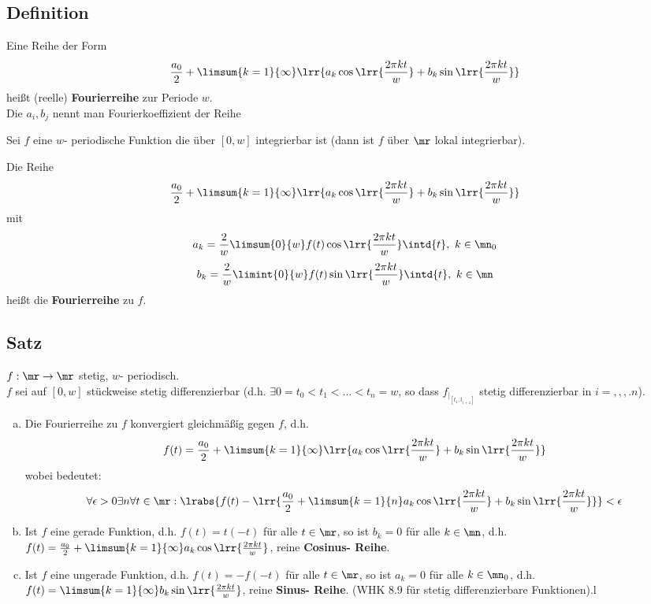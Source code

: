 \subsection{Definition}
	\item Eine Reihe der Form
	\[\dfrac{a_0}{2}+\limsum{k=1}{\infty}\lrr{a_k\cos\lrr{\frac{2\pi kt}{w}}+b_k\sin\lrr{\dfrac{2\pi kt}{w}}}\]
	heißt (reelle) \textbf{Fourierreihe} zur Periode $ w $.\\
	Die $ a_i,b_j $ nennt man Fourierkoeffizient der Reihe
	\item Sei $ f $ eine $ w $- periodische Funktion die über $ [0,w] $ integrierbar ist (dann ist $ f $ über $ \mr $ lokal integrierbar).
	
	Die Reihe
	\[\dfrac{a_0}{2}+\limsum{k=1}{\infty}\lrr{a_k\cos\lrr{\frac{2\pi kt}{w}}+b_k\sin\lrr{\dfrac{2\pi kt}{w}}}\]
	mit
	\[a_k=\frac{2}{w}\limsum{0}{w}f(t)\cos\lrr{\dfrac{2\pi kt}{w}}\intd{t},\ k\in\mn_0\]
	\[b_k=\frac{2}{w}\limint{0}{w}f(t)\sin\lrr{\dfrac{2\pi kt}{w}}\intd{t},\ k\in\mn\]
	heißt die \textbf{Fourierreihe} zu $ f $.
	\subExEnd
	
\subsection{Satz}
	$ f:\mr\rightarrow\mr $ stetig, $ w $- periodisch.\\
	$ f $ sei auf $[0,w]$ stückweise stetig differenzierbar (d.h. $\exists 0=t_0<t_1<...<t_n=w$, so dass $f_{|_{[t_1,t_{i+1}]}}$ stetig differenzierbar in $i=,,,.n$).
	\begin{enumerate}[a)]
	\item Die Fourierreihe zu $f$ konvergiert gleichmäßig gegen $f$, d.h.
	\[f(t)=\dfrac{a_0}{2}+\limsum{k=1}{\infty}\lrr{a_k\cos\lrr{\dfrac{2\pi kt}{w}}+b_k\sin\lrr{\dfrac{2\pi kt}{w}}}\]
	wobei  bedeutet: \[\forall\epsilon>0\exists n\forall t\in\mr: \lrabs{f(t)-\lrr{\dfrac{a_0}{2}+\limsum{k=1}{n}a_k\cos\lrr{\dfrac{2\pi kt}{w}}+b_k\sin\lrr{\dfrac{2\pi kt}{w}}}}<\epsilon\]
	\item Ist $f$ eine gerade Funktion, d.h. $f(t)=t(-t)$ für alle $t\in\mr$, so ist $b_k=0$ für alle $k\in\mn$, d.h. $f(t)=\frac{a_0}{2}+\limsum{k=1}{\infty}a_k\cos\lrr{\frac{2\pi kt}{w}}$, reine \textbf{Cosinus- Reihe}.
	\item Ist $f$ eine ungerade Funktion, d.h. $f(t)=-f(-t)$ für alle $t\in\mr$, so ist $a_k=0$ für alle $k\in\mn_0$, d.h. $f(t)=\limsum{k=1}{\infty}b_k\sin\lrr{\frac{2\pi kt}{w}}$, reine \textbf{Sinus- Reihe}. (WHK 8.9 für stetig differenzierbare Funktionen).l
	\end{enumerate}
	
